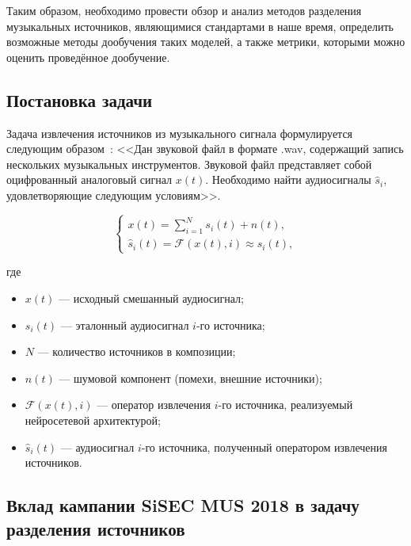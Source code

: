 \documentclass[14pt]{extarticle}
\begin{document}
\par Таким образом, необходимо провести обзор и анализ методов разделения музыкальных источников, являющимися стандартами 
в наше время, определить возможные методы дообучения таких моделей, а также метрики, которыми можно оценить проведённое дообучение.

\subsection{Постановка задачи}
Задача извлечения источников из музыкального сигнала формулируется следующим образом~\cite{digital_signal}: <<Дан звуковой файл в формате .wav, 
содержащий запись нескольких музыкальных инструментов. Звуковой файл представляет собой оцифрованный аналоговый сигнал $x(t)$.
Необходимо найти аудиосигналы $\hat{s}_i$, удовлетворяющие следующим условиям>>.

\begin{equation*}
\begin{cases}
    x(t) = \displaystyle\sum_{i=1}^{N} s_i(t) + n(t), \\[8pt]
    \hat{s}_i(t) = \mathcal{F}(x(t), i) \approx s_i(t),
\end{cases}
\label{eq:task_system}
\end{equation*}

где
\begin{itemize}[label=$\bullet$, wide]
    \item $x(t)$ --- исходный смешанный аудиосигнал;
    \item $s_i(t)$ --- эталонный аудиосигнал $i$-го источника;
    \item $N$ --- количество источников в композиции;
    \item $n(t)$ --- шумовой компонент (помехи, внешние источники);
    \item $\mathcal{F}(x(t), i)$ --- оператор извлечения $i$-го источника, реализуемый нейросетевой архитектурой;
    \item $\hat{s}_i(t)$ --- аудиосигнал $i$-го источника, полученный оператором извлечения источников.
\end{itemize}


\subsection{Вклад кампании SiSEC MUS 2018 в задачу разделения источников}
\end{document}
